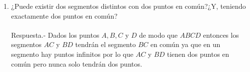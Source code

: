 \begin{enumerate}
    \item ¿Puede existir dos segmentos distintos con dos puntos en común?¿Y, teniendo exactamente dos puntos en común?\\\\
    Respuesta.-\; Dados los puntos $A, B, C$ y $D$ de modo que $ABCD$ entonces los segmentos $AC$ y $BD$ tendrán el segmento $BC$ en común ya que en un segmento hay puntos infinitos por lo que $AC$ y $BD$ tienen dos puntos en común pero nunca solo tendrán dos puntos.\\\\

\end{enumerate}

